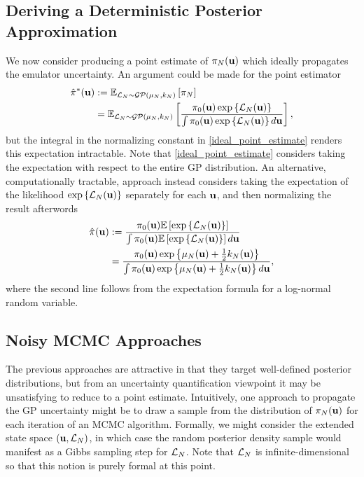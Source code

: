 \documentclass[12pt]{article}
\begin{document}
\subsection{Deriving a Deterministic Posterior Approximation}
We now consider producing a point estimate of $\postDens_{\Ndesign}(\bpar)$ which ideally propagates the emulator uncertainty. An argument could 
be made for the point estimator 
\begin{align}
\hat{\postDens}^*(\bpar) 
&:= \E_{\llik_{\Ndesign} \sim \GP(\GPMeanPred[\Ndesign], \GPKerPred[\Ndesign])} \left[ \postDens_{\Ndesign} \right] \nonumber \\
&= \E_{\llik_{\Ndesign} \sim \GP(\GPMeanPred[\Ndesign], \GPKerPred[\Ndesign])} \left[ \frac{\priorDens(\bpar) \exp\left\{\llik_{\Ndesign}(\bpar) \right\}}{\int \priorDens(\bpar) \exp\left\{\llik_{\Ndesign}(\bpar) \right\} d\bpar} \right] \label{ideal_point_estimate},
\end{align}
but the integral in the normalizing constant in \ref{ideal_point_estimate} renders this expectation intractable. Note that \ref{ideal_point_estimate} considers taking the 
expectation with respect to the entire GP distribution. An alternative, computationally tractable, approach instead considers taking the expectation of the 
likelihood $\exp\left\{\llik_{\Ndesign}(\bpar)\right\}$ separately for each $\bpar$, and then normalizing the result afterwords
\begin{align}
\hat{\postDens}(\bpar) 
&:= \frac{\priorDens(\bpar) \E\left[\exp\left\{\llik_{\Ndesign}(\bpar)\right\} \right]}{\int \priorDens(\bpar) \E\left[\exp\left\{\llik_{\Ndesign}(\bpar)\right\} \right] d\bpar} \\
&= \frac{\priorDens(\bpar) \exp\left\{\GPMeanPred[\Ndesign](\bpar) + \frac{1}{2}\GPKerPred[\Ndesign](\bpar) \right\}}{\int \priorDens(\bpar) \exp\left\{\GPMeanPred[\Ndesign](\bpar) + \frac{1}{2}\GPKerPred[\Ndesign](\bpar) \right\} d\bpar},
\end{align}
where the second line follows from the expectation formula for a log-normal random variable. 

\subsection{Noisy MCMC Approaches}
The previous approaches are attractive in that they target well-defined posterior distributions, but from an uncertainty quantification viewpoint it may
be unsatisfying to reduce to a point estimate. Intuitively, one approach to propagate the GP uncertainty might be to draw a sample from the 
distribution of $\postDens_{\Ndesign}(\bpar)$ for each iteration of an MCMC algorithm. Formally, we might consider the extended state space 
$(\bpar, \llik_{\Ndesign})$, in which case the random posterior density sample would manifest as a Gibbs sampling step for $\llik_{\Ndesign}$. 
Note that $\llik_{\Ndesign}$ is infinite-dimensional so that this notion is purely formal at this point. 
\end{document}
